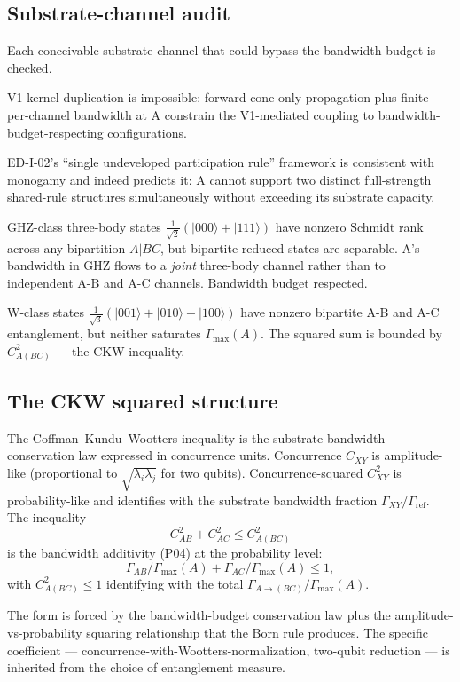 \documentclass[11pt,a4paper]{article}
\begin{document}
\subsection{Substrate-channel audit}

Each conceivable substrate channel that could bypass the bandwidth budget is checked.

V1 kernel duplication is impossible: forward-cone-only propagation plus finite per-channel bandwidth at A constrain the V1-mediated coupling to bandwidth-budget-respecting configurations.

ED-I-02's ``single undeveloped participation rule'' framework is consistent with monogamy and indeed predicts it: A cannot support two distinct full-strength shared-rule structures simultaneously without exceeding its substrate capacity.

GHZ-class three-body states $\frac{1}{\sqrt{2}}(|000\rangle + |111\rangle)$ have nonzero Schmidt rank across any bipartition $A|BC$, but bipartite reduced states are separable. A's bandwidth in GHZ flows to a \emph{joint} three-body channel rather than to independent A-B and A-C channels. Bandwidth budget respected.

W-class states $\frac{1}{\sqrt{3}}(|001\rangle + |010\rangle + |100\rangle)$ have nonzero bipartite A-B and A-C entanglement, but neither saturates $\Gamma_{\max}(A)$. The squared sum is bounded by $C_{A(BC)}^2$ --- the CKW inequality.

\subsection{The CKW squared structure}

The Coffman--Kundu--Wootters inequality is the substrate bandwidth-conservation law expressed in concurrence units. Concurrence $C_{XY}$ is amplitude-like (proportional to $\sqrt{\lambda_i \lambda_j}$ for two qubits). Concurrence-squared $C_{XY}^2$ is probability-like and identifies with the substrate bandwidth fraction $\Gamma_{XY}/\Gamma_{\mathrm{ref}}$. The inequality
\[
C_{AB}^{2} + C_{AC}^{2} \leq C_{A(BC)}^{2}
\]
is the bandwidth additivity (P04) at the probability level:
\[
\Gamma_{AB}/\Gamma_{\max}(A) + \Gamma_{AC}/\Gamma_{\max}(A) \leq 1,
\]
with $C_{A(BC)}^2 \leq 1$ identifying with the total $\Gamma_{A \to (BC)}/\Gamma_{\max}(A)$.

The form is forced by the bandwidth-budget conservation law plus the amplitude-vs-probability squaring relationship that the Born rule produces. The specific coefficient --- concurrence-with-Wootters-normalization, two-qubit reduction --- is inherited from the choice of entanglement measure.
\end{document}
